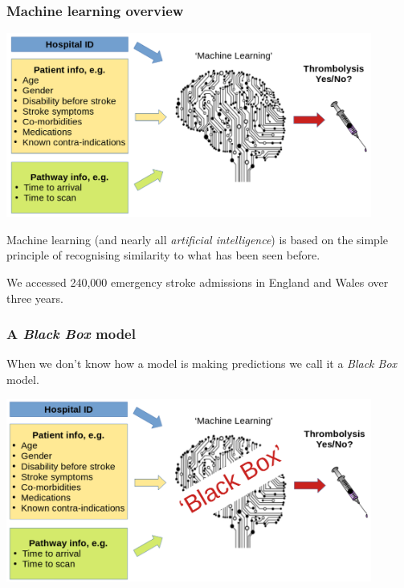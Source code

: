 \documentclass{beamer}
\begin{document}

\begin{frame}
\frametitle{Machine learning overview}
\begin{center}
\includegraphics[width=0.90\textwidth]{./images/ml_model_high_level}
\end{center}


Machine learning (and nearly all \emph{artificial intelligence}) is based on the simple principle of recognising similarity to what has been seen before.
\vspace{3mm}

We accessed 240,000 emergency stroke admissions in England and Wales over three years.
\end{frame}



\begin{frame}
\frametitle{A \emph{Black Box} model}
When we don't know how a model is making predictions we call it a \emph{Black Box} model.
\vspace{4mm}
\begin{center}
\includegraphics[width=0.90\textwidth]{./images/black_box}
\end{center}
\end{frame}
\end{document}
